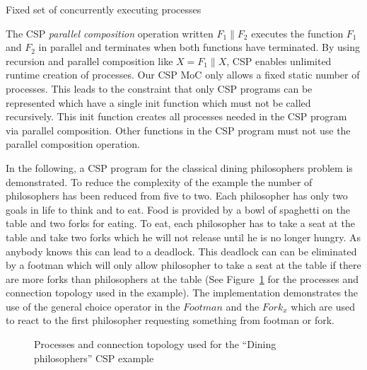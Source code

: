 \begin{characteristic}\label{characteristic-csp-concurrent-processes}
  Fixed set of concurrently executing processes
  
  The CSP \emph{parallel composition} operation written $F_1 \| F_2$ executes the
  function $F_1$ and $F_2$ in parallel and terminates when both functions
  have terminated. By using recursion and parallel composition
  like $X = F_1 \| X$, CSP enables unlimited runtime creation of processes.
  Our CSP MoC only allows a fixed static number of processes. This
  leads to the constraint that only CSP programs can be represented which
  have a single init function which must not be called recursively. This init
  function creates all processes needed in the CSP program via parallel composition.
  Other functions in the CSP program must not use the parallel composition
  operation.
\end{characteristic}

%  

In the following, a CSP program for the classical dining
philosophers problem is demonstrated. To reduce the complexity
of the example the number of philosophers has been reduced from five
to two. Each philosopher has only two goals in life to think and
to eat. Food is provided by a bowl of spaghetti on the table and
two forks for eating. To eat, each philosopher has to take a seat
at the table and take two forks which he will not release until he
is no longer hungry. As anybody knows this can lead to a deadlock.
This deadlock can can be eliminated by a footman which will only
allow philosopher to take a seat at the table if there are more
forks than philosophers at the table (See Figure~\ref{fig:dining-philosophers}
for the processes and connection topology used in the example).
The implementation demonstrates the use of the general choice operator
in the $Footman$ and the $Fork_{x}$ which are used to react to the first
philosopher requesting something from footman or fork.

\begin{figure}[h]
\centering

\caption{Processes and connection topology used for the ``Dining philosophers'' CSP example}
\label{fig:dining-philosophers}
\end{figure}

